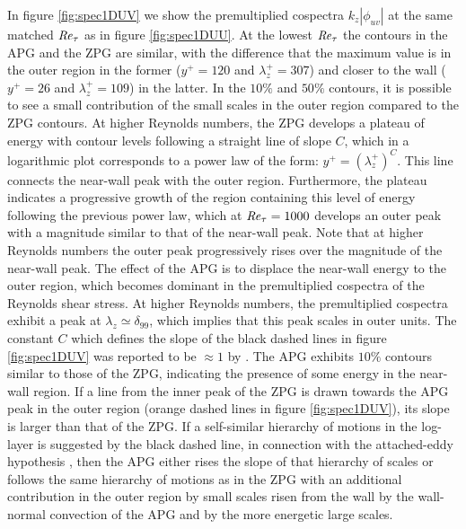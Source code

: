 In figure \ref{fig:spec1DUV} we show the premultiplied cospectra $k_z |\phi_{uv}|$ at the same matched $\mbox{\textit{Re}}_{\tau}$ as in figure \ref{fig:spec1DUU}. 
At the lowest $\mbox{\textit{Re}}_{\tau}$ the contours in the APG and the ZPG are similar, with the difference that the maximum value is in the outer region in the former ($y^+=120$ and $\lambda_z^+=307$) and closer to the wall ($y^+=26$ and $\lambda_z^+=109$) in the latter.
In the $10\%$ and $50\%$ contours, it is possible to see a small contribution of the small scales in the outer region compared to the ZPG contours.
At higher Reynolds numbers, the ZPG  develops a plateau of energy with contour levels following a straight line of slope $C$, which in a logarithmic plot corresponds to a power law of the form: $y^+=(\lambda_z^+)^C$.
This line connects the near-wall peak  with the outer region. Furthermore, the plateau indicates a progressive growth of the region containing this level of energy following the previous power law, which at $\mbox{\textit{Re}}_{\tau}=1000$ develops an outer peak with a magnitude similar to that of the near-wall peak. Note that at higher Reynolds numbers the outer peak progressively rises over the magnitude of the near-wall peak.
The effect of the APG is to displace the near-wall energy to the outer region, which becomes dominant in the premultiplied cospectra of the Reynolds shear stress. At higher Reynolds numbers, the premultiplied cospectra exhibit a peak at $\lambda_z \simeq \delta_{99}$, which implies that this peak scales in outer units.
The constant $C$ which defines the slope of the black dashed lines in figure \ref{fig:spec1DUV} was reported to be $\approx 1$ by \cite{giovanetti2016}. The APG exhibits $10\%$ contours similar to those of the ZPG, indicating the presence of some energy in the near-wall region. If a line from the inner peak of the ZPG is drawn towards the APG peak in the outer region (orange dashed lines in figure \ref{fig:spec1DUV}), its slope is larger than that of the ZPG. If a self-similar hierarchy of motions in the log-layer is suggested by the black dashed line, in connection with the attached-eddy hypothesis \citep{Townsend_1976, deshpande_2021}, then the APG either rises the slope of that hierarchy of scales or follows the same hierarchy of motions as in the ZPG with an additional contribution in the outer region by small scales risen from the wall by the wall-normal convection of the APG and by the more energetic large scales.

